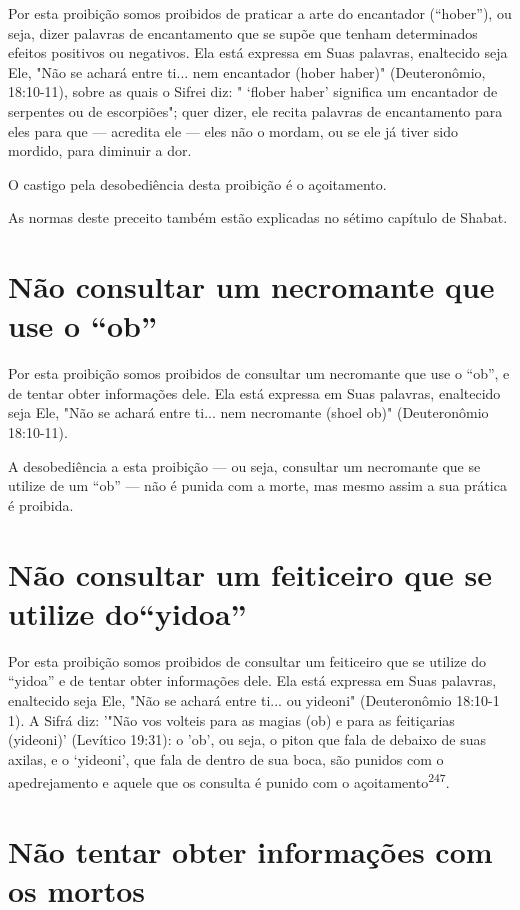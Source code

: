 Por esta proibição somos proibidos de praticar a arte do encantador
(``hober''), ou seja, dizer palavras de encantamento que se supõe que
tenham determinados efeitos positivos ou negativos. Ela está expressa em
Suas pala­vras, enaltecido seja Ele, "Não se achará entre ti... nem
encantador (hober ha­ber)" (Deuteronômio, 18:10-11), sobre as quais o
Sifrei diz: " `flober haber' significa um encantador de serpentes ou de
escorpiões"; quer dizer, ele recita palavras de encantamento para eles
para que --- acredita ele --- eles não o mor­dam, ou se ele já tiver
sido mordido, para diminuir a dor.

O castigo pela desobediência desta proibição é o açoitamento.

As normas deste preceito também estão explicadas no sétimo capí­tulo de
Shabat.

\section{Não consultar um necromante que use o ``ob''}

Por esta proibição somos proibidos de consultar um necromante que use o
``ob'', e de tentar obter informações dele. Ela está expressa em Suas
pala­vras, enaltecido seja Ele, "Não se achará entre ti... nem
necromante (shoel ob)" (Deuteronômio 18:10-11).

A desobediência a esta proibição --- ou seja, consultar um necromante
que se utilize de um ``ob'' --- não é punida com a morte, mas mesmo assim
a sua prática é proibida.


\section{Não consultar um feiticeiro que se utilize do``yidoa''}


Por esta proibição somos proibidos de consultar um feiticeiro que se
utilize do ``yidoa'' e de tentar obter informações dele. Ela está expressa
em Suas palavras, enaltecido seja Ele, "Não se achará entre ti... ou
yideoni" (Deute­ronômio 18:10-1 1). A Sifrá diz: '"Não vos volteis para
as magias (ob) e para as feitiçarias (yideoni)' (Levítico 19:31): o
'ob', ou seja, o piton que fala de debaixo de suas axilas, e o
`yideoni', que fala de dentro de sua boca, são punidos com o
apedrejamento e aquele que os consulta é punido com o
açoitamento\textsuperscript{247}.

\section{Não tentar obter informações com os mortos}

